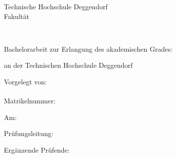 \begin{titlepage}
\begin{center}
	{
	Technische Hochschule Deggendorf\\
	Fakultät \faculty\par}
	\vspace{.2cm}
{\Large \studies\\}
\vspace{6\baselineskip}
{\thesistitleDE\par}
\vspace{1cm}
{\thesistitleEN\par}
\vspace{6\baselineskip}

Bachelorarbeit zur Erlangung des akademischen Grades:

	\vspace{.2cm}
	\emph{\degree}
	\vspace{.2cm}

an der Technischen Hochschule Deggendorf\\
\end{center}
\vfill
\parbox[t]{.4\textwidth}{
	Vorgelegt von:\\
	\student\\
	Matrikelnummer: \matrnr\par
	\vspace{\baselineskip}
	Am: \submissiondate\par
}
\hfill
\parbox[t]{.4\textwidth}{
Prüfungsleitung:\\
\supervisor%

\ifthenelse{\equal{\secsupervisor}{}}{}
{%
\vspace{\baselineskip}
Ergänzende Prüfende:\\
\secsupervisor%
}}
\end{titlepage}
\cleardoublepage\par
